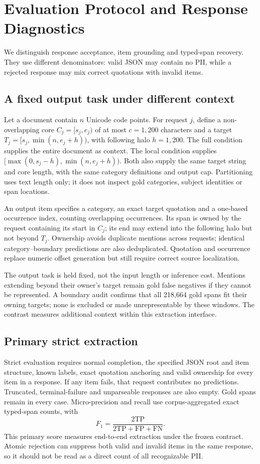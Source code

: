 \section{Evaluation Protocol and Response Diagnostics}
\label{sec:protocol}

We distinguish response acceptance, item grounding and typed-span recovery.
They use different denominators: valid JSON may contain no PII, while a
rejected response may mix correct quotations with invalid items.

\subsection{A fixed output task under different context}
Let a document contain $n$ Unicode code points. For request $j$, define a
non-overlapping core $C_j=[s_j,e_j)$ of at most $c=1{,}200$ characters and a
target $T_j=[s_j,\min(n,e_j+h))$, with following halo $h=1{,}200$.
The full condition supplies the entire document as context. The local
condition supplies $[\max(0,s_j-h),\min(n,e_j+h))$. Both also supply the
same target string and core length, with the same category definitions and
output cap. Partitioning uses text length only; it does not inspect gold
categories, subject identities or span locations.

An output item specifies a category, an exact target quotation and a
one-based occurrence index, counting overlapping occurrences. Its span is
owned by the request containing its start in $C_j$; its end may extend into
the following halo but not beyond $T_j$. Ownership avoids duplicate mentions across requests; identical category--boundary
predictions are also deduplicated. Quotation and occurrence replace numeric
offset generation but still require correct source localization.

The output task is held fixed, not the input length or inference cost.
Mentions extending beyond their owner's target remain gold false negatives
if they cannot be represented. A boundary audit confirms that all 218,664 gold spans fit their owning
targets; none is excluded or made unrepresentable by these windows. The contrast measures additional context within this extraction interface.

\subsection{Primary strict extraction}
Strict evaluation requires normal completion, the specified JSON root and
item structure, known labels, exact quotation anchoring and valid ownership
for every item in a response. If any item fails, that request contributes
no predictions. Truncated, terminal-failure and unparseable responses are
also empty. Gold spans remain in every case. Micro-precision and recall use
corpus-aggregated exact typed-span counts, with
\begin{equation}
 F_1=\frac{2\mathrm{TP}}{2\mathrm{TP}+\mathrm{FP}+\mathrm{FN}}.
\end{equation}
This primary score measures end-to-end extraction under the frozen contract.
Atomic rejection can suppress both valid and invalid items in the same
response, so it should not be read as a direct count of all recognizable PII.

